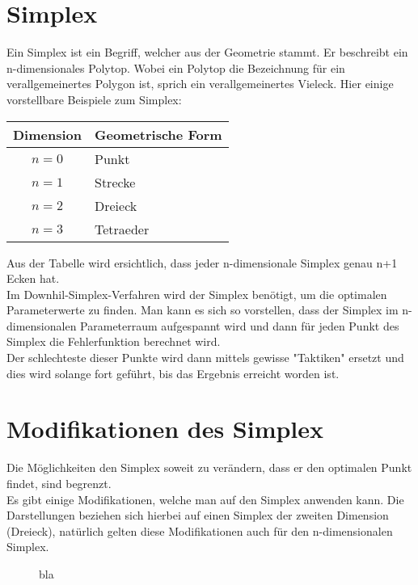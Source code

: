 \section{Simplex}
Ein Simplex ist ein Begriff, welcher aus der Geometrie stammt. Er beschreibt ein n-dimensionales Polytop. Wobei ein Polytop die Bezeichnung für ein verallgemeinertes Polygon ist, sprich ein verallgemeinertes Vieleck. 
Hier einige vorstellbare Beispiele zum Simplex:\\
 
\begin{tabular}{c|l}
Dimension & Geometrische Form\\
\hline
$n=0$ & Punkt\\
$n=1$ & Strecke\\
$n=2$ & Dreieck\\
$n=3$ & Tetraeder
\end{tabular} 

Aus der Tabelle wird ersichtlich, dass jeder n-dimensionale Simplex genau n+1 Ecken hat. \\
Im Downhil-Simplex-Verfahren wird der Simplex benötigt, um die optimalen Parameterwerte zu finden. Man kann es sich so vorstellen, dass der Simplex im n-dimensionalen Parameterraum aufgespannt wird und dann für jeden Punkt des Simplex die Fehlerfunktion berechnet wird. \\
Der schlechteste dieser Punkte wird dann mittels gewisse "Taktiken" ersetzt und dies wird solange fort geführt, bis das Ergebnis erreicht worden ist. 


\section{Modifikationen des Simplex}
Die Möglichkeiten den Simplex soweit zu verändern, dass er den optimalen Punkt findet, sind begrenzt. \\
Es gibt einige Modifikationen, welche man auf den Simplex anwenden kann. Die Darstellungen beziehen sich hierbei auf einen Simplex der zweiten Dimension (Dreieck), natürlich gelten diese Modifikationen auch für den n-dimensionalen Simplex.

\begin{figure}[h]
	\centering
  	\caption{bla}%
	\label{fig:Dreiecke}%
\end{figure}


